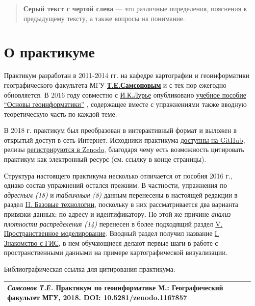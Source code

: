 \documentclass[12pt,]{book}
\begin{document}
\begin{quote}
\textbf{Серый текст с чертой слева} --- это различные определения, пояснения к предыдущему тексту, а также вопросы на понимание.
\end{quote}

\hypertarget{section-3}{%
\section*{О практикуме}\label{section-3}}

Практикум разработан в 2011-2014 гг. на кафедре картографии и геоинформатики географического факультета МГУ \href{https://istina.msu.ru/profile/tsamsonov/}{\textbf{Т.Е.Самсоновым}} и с тех пор ежегодно обновляется. В 2016 году совместно с \href{https://istina.msu.ru/profile/IK_Lurie/}{И.К.Лурье} опубликовано \href{https://istina.msu.ru/download/45821659/1ej66u:uSUtcUS-XmdMMyRRpC-yflDmCv8/}{учебное пособие ``Основы геоинформатики''} , содержащее вместе с упражнениями также вводную теоретическую часть по каждой теме.

В 2018 г. практикум был преобразован в интерактивный формат и выложен в открытый доступ в сеть Интернет. Исходники практикума \href{https://github.com/tsamsonov/arcgis-course}{доступны на GitHub}, релизы \href{https://zenodo.org/record/1167857}{регистрируются в Zenodo}, благодаря чему есть возможность цитировать практикум как электронный ресурс (см. ссылку в конце страницы).

Структура настоящего практикума несколько отличается от пособия 2016 г., однако состав упражнений остался прежним. В частности, упражнения по \emph{адресным (18)} и \emph{табличным (8)} данным перенесены в настоящей редакции в раздел \protect\hyperlink{map-ref-general}{II. Базовые технологии}, поскольку в них рассматривается два варианта привязки данных: по адресу и идентификатору. По этой же причине \emph{анализ плотности распределения (14)} перенесен в более подходящий раздел \protect\hyperlink{density-analysis}{V. Пространственное моделирование}. Вводный раздел получил название \protect\hyperlink{map-design-quaternary}{I. Знакомство с ГИС}, в нем обучающиеся делают первые шаги в работе с пространственными данными на примере картографической визуализации.

Библиографическая ссылка для цитирования практикума:

\begin{longtable}[]{@{}l@{}}
\toprule
\endhead
\emph{Самсонов Т.Е.} \textbf{Практикум по геоинформатике} М.: Географический факультет МГУ, 2018. DOI: 10.5281/zenodo.1167857\tabularnewline
\bottomrule
\end{longtable}
\end{document}
